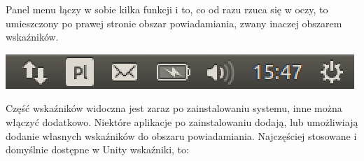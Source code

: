 \textcolor{ubuntu_orange}{Panel menu} łączy w sobie kilka funkcji i to, co od razu rzuca się w oczy, to umieszczony po prawej stronie \textcolor{ubuntu_orange}{obszar powiadamiania}, zwany inaczej obszarem wskaźników.

\begin{center}
	\includegraphics[width=\linewidth]{images/unity_menu_bar.png}
\end{center}

Część wskaźników widoczna jest zaraz po zainstalowaniu systemu, inne można włączyć dodatkowo. Niektóre aplikacje po zainstalowaniu dodają, lub umożliwiają dodanie własnych wskaźników do obszaru powiadamiania. Najczęściej stosowane i domyślnie dostępne w Unity wskaźniki, to:
